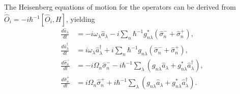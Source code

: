 The Heisenberg equations of motion for the operators can be derived from  $\dot {\hat O}_i = -i{\hbar^{-1}[\hat O_i,H]}$,
yielding~\cite{Wubs2004}
\begin{align}
\frac{d\hat{a}_\lambda}{dt}&=-i\omega_\lambda \hat{a}_\lambda-i\sum_n\hbar^{-1}g_{n\lambda}^*(\hat{\sigma}_n^-+\hat{\sigma}_n^+), \label{eq:a-t}\\
%
\frac{d\hat{a}_\lambda^\dagger}{dt}&=i\omega_\lambda \hat{a}_\lambda^\dagger+i\sum_n\hbar^{-1}g_{n\lambda}(\hat{\sigma}_n^-+\hat{\sigma}_n^+), \label{eq:a+t}\\
%
\frac{d\hat{\sigma}_n^-}{dt}&=-i\Omega_n\hat{\sigma}^-_n-i\hbar^{-1}\sum_{\lambda}(g_{n\lambda}
\hat{a}_\lambda+g_{n\lambda}^*\hat{a}_\lambda^\dagger), \label{eq:sig-t} \\
%
\frac{d\hat{\sigma}_n^+}{dt}&=i\Omega_n\hat{\sigma}^+_n+i\hbar^{-1}\sum_{\lambda}(g_{n\lambda}
\hat{a}_\lambda+g_{n\lambda}^*\hat{a}_\lambda^\dagger). \label{eq:sig+t}
%
\end{align}

